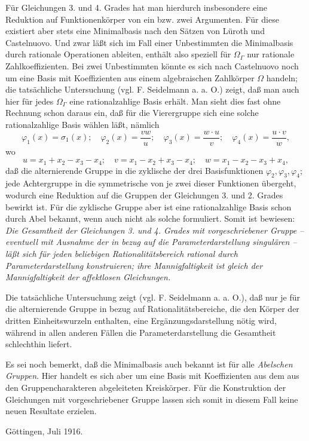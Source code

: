 Für Gleichungen 3. und 4. Grades hat man hierdurch insbesondere eine Reduktion auf Funktionenkörper von ein bzw. zwei Argumenten. Für diese existiert aber stets eine Minimalbasis nach den Sätzen von Lüroth und Castelnuovo. Und zwar läßt sich im Fall einer Unbestimmten die Minimalbasis durch rationale Operationen ableiten, enthält also speziell für $\Omega_\Gamma$ nur rationale Zahlkoeffizienten. Bei zwei Unbestimmten könnte es sich nach Castelnuovo noch um eine Basis mit Koeffizienten aus einem algebraischen Zahlkörper $\Omega$ handeln; die tatsächliche Untersuchung (vgl. F. Seidelmann a. a. O.) zeigt, daß man auch hier für jedes $\Omega_\Gamma$ eine rationalzahlige Basis erhält. Man sieht dies fast ohne Rechnung schon daraus ein, daß für die Vierergruppe sich eine solche rationalzahlige Basis wählen läßt, nämlich
\[
\varphi_1(x)=\sigma_1(x);\quad \varphi_2(x)=\frac{v w}{u};\quad \varphi_3(x)=\frac{w\cdot u}{v};\quad \varphi_4(x)=\frac{u\cdot v}{w},
\]
wo
\[
u=x_1+x_2-x_3-x_4;\quad v=x_1-x_2+x_3-x_4;\quad w=x_1-x_2-x_3+x_4,
\]
daß die alternierende Gruppe in die zyklische der drei Basisfunktionen $\varphi_2,\varphi_3,\varphi_4$; jede Achtergruppe in die symmetrische von je zwei dieser Funktionen übergeht, wodurch eine Reduktion auf die Gruppen der Gleichungen 3. und 2. Grades bewirkt ist. Für die zyklische Gruppe aber ist eine rationalzahlige Basis schon durch Abel bekannt, wenn auch nicht als solche formuliert. Somit ist bewiesen: \emph{Die Gesamtheit der Gleichungen 3. und 4. Grades mit vorgeschriebener Gruppe -- eventuell mit Ausnahme der in bezug auf die Parameterdarstellung singulären -- läßt sich für jeden beliebigen Rationalitätsbereich rational durch Parameterdarstellung konstruieren; ihre Mannigfaltigkeit ist gleich der Mannigfaltigkeit der affektlosen Gleichungen.}

Die tatsächliche Untersuchung zeigt (vgl. F. Seidelmann a. a. O.), daß nur je für die alternierende Gruppe in bezug auf Rationalitätsbereiche, die den Körper der dritten Einheitswurzeln enthalten, eine Ergänzungsdarstellung nötig wird, während in allen anderen Fällen die Parameterdarstellung die Gesamtheit schlechthin liefert.

Es sei noch bemerkt, daß die Minimalbasis auch bekannt ist für alle \emph{Abelschen Gruppen}. Hier handelt es sich aber um eine Basis mit Koeffizienten aus dem aus den Gruppencharakteren abgeleiteten Kreiskörper. Für die Konstruktion der Gleichungen mit vorgeschriebener Gruppe lassen sich somit in diesem Fall keine neuen Resultate erzielen.

Göttingen, Juli 1916.

\clearpage
\setcounter{footnote}{0}
\providecommand{\bdelta}{\bar{\delta}}
